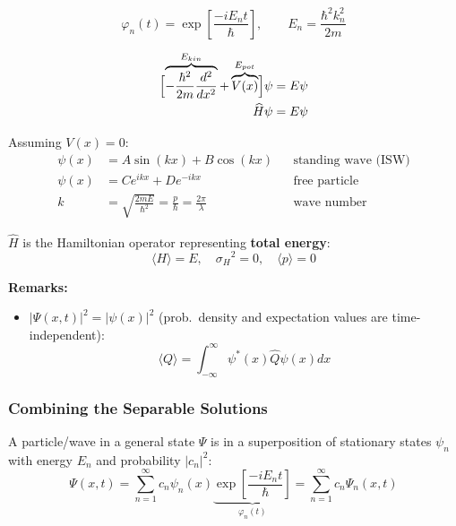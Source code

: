 \noindent\begin{equation*}
    \varphi_n(t)       =\exp\left[\frac{-iE_n t}{\hbar}\right], \qquad E_n = \frac{\hbar^2 k_n^2}{2m}
\end{equation*}

\noindent\begin{align*}
    \Bigl[\overbrace{-\frac{\hbar^2}{2m}\frac{d^2}{dx^2}}^{E_{kin}}+ \overbrace{V(x)}^{E_{pot}}\Bigr]\psi & = E\psi \\
    \widehat{H}\psi                                                                                       & = E\psi
\end{align*}

\newpar{}
Assuming $V(x) = 0$:
\noindent\begin{align*}
    \psi(x) & =A\sin(kx)+B\cos(kx)                                               &  & \text{standing wave (ISW)} \\
    \psi(x) & =Ce^{ikx}+De^{-ikx}                                                &  & \text{free particle}       \\
    k       & =\sqrt{\frac{2mE}{\hbar^{2}}}=\frac{p}{\hbar}=\frac{2\pi}{\lambda} &  & \text{wave number}
\end{align*}


$\widehat{H}$ is the Hamiltonian operator representing \textbf{total energy}:
\noindent\begin{equation*}
    \langle H\rangle = E,\quad{\sigma_H}^2 = 0, \quad \langle p\rangle = 0
\end{equation*}

\newpar{}

\textbf{Remarks:}
\begin{itemize}
    \item $|\Psi(x,t)|^2 = |\psi(x)|^2$ (prob.\ density and expectation values are time-independent):
          \noindent\begin{equation*}
              \langle Q\rangle=\int_{-\infty}^\infty\psi^*(x)\widehat{Q}\psi(x)dx
          \end{equation*}
\end{itemize}

\subsubsection{Combining the Separable Solutions}
A particle/wave in a general state $\Psi$ is in a superposition of stationary states $\psi_n$ with energy $E_n$ and probability $|c_n|^2$:
\noindent\begin{equation*}
    \Psi(x,t) =\sum_{n=1}^\infty c_n\psi_n(x) \underbrace{\exp\left[\frac{-iE_n t}{\hbar}\right]}_{\varphi_n(t)}=\sum_{n=1}^\infty c_n\Psi_n(x,t)
\end{equation*}

